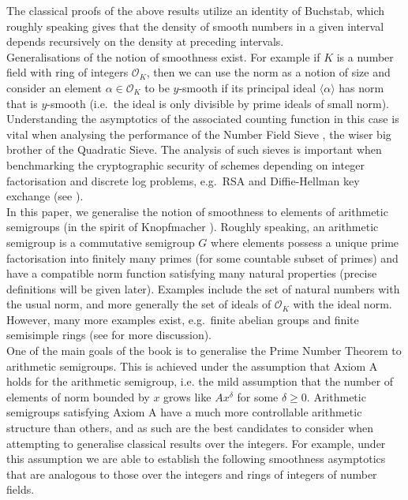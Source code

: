 \documentclass[a4paper]{amsart}
\begin{document}
The classical proofs of the above results utilize an identity of Buchstab, which roughly speaking gives that the density of smooth numbers in a given interval depends recursively on the density at preceding intervals. \\

Generalisations of the notion of smoothness exist. For example if $K$ is a number field with ring of integers $\mathcal{O}_K$, then we can use the norm as a notion of size and consider an element $\alpha\in\mathcal{O}_K$ to be $y$-smooth if its principal ideal $\langle\alpha\rangle$ has norm that is $y$-smooth (i.e.\ the ideal is only divisible by prime ideals of small norm). Understanding the asymptotics of the associated counting function in this case is vital when analysing the performance of the Number Field Sieve \cite{buhler2008algorithmic}, the wiser big brother of the Quadratic Sieve. The analysis of such sieves is important when benchmarking the cryptographic security of schemes depending on integer factorisation and discrete log problems, e.g.\ RSA and Diffie-Hellman key exchange (see \cite{buhler2008algorithmic}).\\

In this paper, we generalise the notion of smoothness to elements of arithmetic semigroups (in the spirit of Knopfmacher
\cite{knopfmacher2015abstract}). Roughly speaking, an arithmetic semigroup is a
commutative semigroup $G$ where elements possess a unique prime factorisation into finitely many primes (for some countable subset of primes) and have a compatible norm function satisfying many natural properties (precise definitions will be given later). Examples include the set of natural numbers with the usual norm, and more generally the set of ideals of $\mathcal{O}_K$ with the ideal norm. However, many more examples exist, e.g.\ finite abelian groups and finite semisimple rings (see \cite{knopfmacher2015abstract} for more discussion).\\

One of the main goals of the book \cite{knopfmacher2015abstract} is to generalise the Prime Number Theorem to arithmetic semigroups. This is achieved under the assumption that Axiom A holds for the arithmetic semigroup, i.e. the mild assumption that the number of elements of norm bounded by $x$ grows like $Ax^{\delta}$ for some $\delta \geq 0$. Arithmetic semigroups satisfying Axiom A have a much more controllable arithmetic structure than others, and as such are the best candidates to consider when attempting to generalise classical results over the integers. For example, under this assumption we are able to establish the following smoothness asymptotics that are analogous to those over the integers and rings of integers of number fields.
\end{document}
